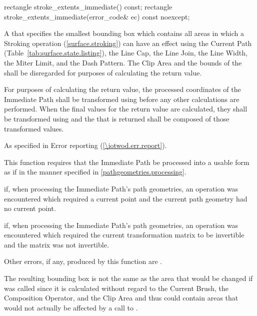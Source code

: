 \begin{itemdecl}
rectangle stroke_extents_immediate() const;
rectangle stroke_extents_immediate(error_code& ec) const noexcept;
\end{itemdecl}
\begin{itemdescr}
\pnum
\returns
A  that specifies the smallest bounding box which contains all areas in which a Stroking operation (\ref{surface.stroking}) can have an effect using the Current Path (Table~\ref{tab:surface.state.listing}), the Line Cap, the Line Join, the Line Width, the Miter Limit, and the Dash Pattern. The Clip Area and the bounds of the \underlyingsurface shall be disregarded for purposes of calculating the return value.

\pnum
For purposes of calculating the return value, the processed coordinates of the Immediate Path shall be transformed using  before any other calculations are performed. When the final values for the return value are calculated, they shall be transformed using  and the  that is returned shall be composed of those transformed values.

\pnum
\throws
As specified in Error reporting (\ref{\iotwod.err.report}).

\pnum
\remarks
This function requires that the Immediate Path be processed into a usable form as if in the manner specified in \ref{pathgeometries.processing}.

\pnum
\errors
{} if, when processing the Immediate Path's path geometries, an operation was encountered which required a current point and the current path geometry had no current point.

\pnum
{} if, when processing the Immediate Path's path geometries, an operation was encountered which required the current transformation matrix to be invertible and the matrix was not invertible.

\pnum
Other errors, if any, produced by this function are .

\pnum
\realnotes
The resulting bounding box is not the same as the area that would be changed if  was called since it is calculated without regard to the Current Brush, the Composition Operator, and the Clip Area and thus could contain areas that would not actually be affected by a call to .
\end{itemdescr}

